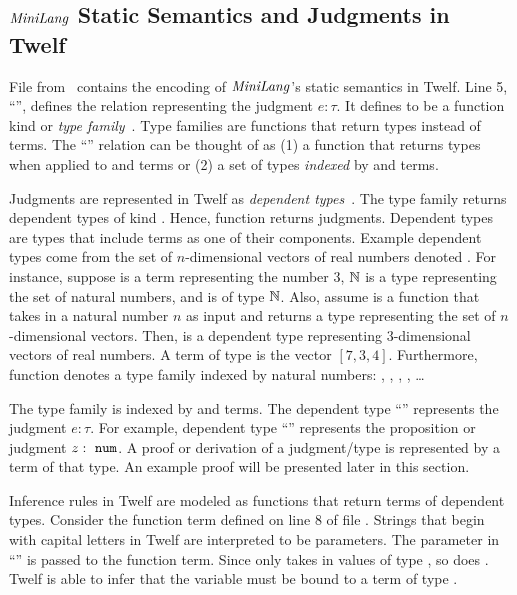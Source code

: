 \subsection{\texorpdfstring{$\mathit{MiniLang}$}{MiniLang} Static Semantics and Judgments in Twelf}
\label{sec:twelf-static}
File  from~\cite{twelf-tutorial} contains the encoding of
$\mathit{MiniLang}$'s static semantics in Twelf.
Line 5, ``'',
defines the relation  representing
the judgment $e : \tau$.
It defines  to be a function kind or
\emph{type family}~\cite{GHCTypeFamily,TwelfTypeFamily}.
Type families are functions that return types instead of terms.
The ``'' relation can be thought of as (1) a function
that returns types when applied to  and  terms
or (2) a set of types \emph{indexed} by  and  terms.

Judgments are represented in Twelf as
\emph{dependent types}~\cite{TwelfTypeJudge,advancetypes_ch02,Twelf-DependentTypes}.
The  type family returns dependent types of kind .
Hence, function  returns judgments.
Dependent types are types that include terms as one of their components.
Example dependent types come from the set of $n$-dimensional vectors
of real numbers denoted .
For instance, suppose  is a term representing the number $3$,
$\mathbb{N}$ is a type representing the set of natural numbers,
and  is of type $\mathbb{N}$.
Also, assume  is a function that takes in a natural
number $n$ as input and returns a type representing
the set of $n$-dimensional vectors.
Then,  is a dependent type representing
$3$-dimensional vectors of real numbers.
A term of type  is the vector $[7, 3, 4]$.
Furthermore, function  denotes a type family
indexed by natural numbers:
, , , , \ldots

The  type family is indexed by  and  terms.
The dependent type ``\mbox{}'' represents
the judgment $e : \tau$.
For example, dependent type ``\mbox{}''
represents the proposition or judgment $z :\ \texttt{num}$.
A proof or derivation of a judgment/type is represented by a term of that type.
An example proof will be presented later in this section.

Inference rules in Twelf are modeled as functions that return terms
of dependent types.
Consider the function term  defined on line 8
of file .
Strings that begin with capital letters in Twelf are interpreted
to be parameters.
The  parameter in ``\mbox{}'' is passed
to the  function term.
Since  only takes in values of type
, so does .
Twelf is able to infer that the  variable must be
bound to a term of type .

